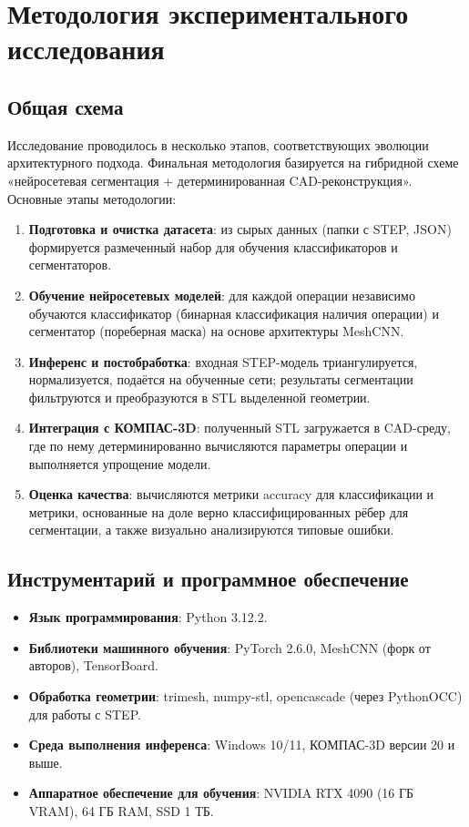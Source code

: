
\section{Методология экспериментального исследования}

\subsection{Общая схема}
Исследование проводилось в несколько этапов, соответствующих эволюции архитектурного подхода. Финальная методология базируется на гибридной схеме «нейросетевая сегментация + детерминированная CAD-реконструкция». Основные этапы методологии:

\begin{enumerate}
    \item \textbf{Подготовка и очистка датасета}: из сырых данных (папки с STEP, JSON) формируется размеченный набор для обучения классификаторов и сегментаторов.
    \item \textbf{Обучение нейросетевых моделей}: для каждой операции независимо обучаются классификатор (бинарная классификация наличия операции) и сегментатор (пореберная маска) на основе архитектуры MeshCNN.
    \item \textbf{Инференс и постобработка}: входная STEP-модель триангулируется, нормализуется, подаётся на обученные сети; результаты сегментации фильтруются и преобразуются в STL выделенной геометрии.
    \item \textbf{Интеграция с КОМПАС-3D}: полученный STL загружается в CAD-среду, где по нему детерминированно вычисляются параметры операции и выполняется упрощение модели.
    \item \textbf{Оценка качества}: вычисляются метрики accuracy для классификации и метрики, основанные на доле верно классифицированных рёбер для сегментации, а также визуально анализируются типовые ошибки.
\end{enumerate}

\subsection{Инструментарий и программное обеспечение}
\begin{itemize}
    \item \textbf{Язык программирования}: Python 3.12.2.
    \item \textbf{Библиотеки машинного обучения}: PyTorch 2.6.0, MeshCNN (форк от авторов), TensorBoard.
    \item \textbf{Обработка геометрии}: trimesh, numpy-stl, opencascade (через PythonOCC) для работы с STEP.
    \item \textbf{Среда выполнения инференса}: Windows 10/11, КОМПАС-3D версии 20 и выше.
    \item \textbf{Аппаратное обеспечение для обучения}: NVIDIA RTX 4090 (16 ГБ VRAM), 64 ГБ RAM, SSD 1 ТБ.
\end{itemize}

